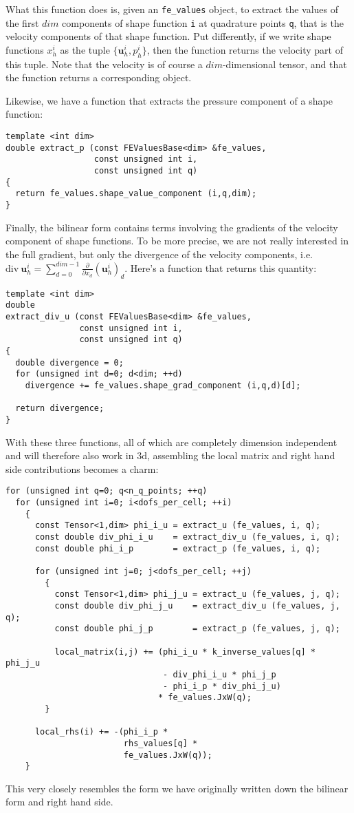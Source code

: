 \documentclass{article}
\renewcommand{\vec}[1]{\mathbf{#1}}
\begin{document}
What this function does is, given an \texttt{fe\_values} object, to extract
the values of the first $dim$ components of shape function \texttt{i} at
quadrature points \texttt{q}, that is the velocity components of that shape
function. Put differently, if we write shape functions $x_h^i$ as the tuple
$\{\vec u_h^i,p_h^i\}$, then the function returns the velocity part of this
tuple. Note that the velocity is of course a $dim$-dimensional tensor, and
that the function returns a corresponding object.

Likewise, we have a function that extracts the pressure component of a shape
function:
\begin{verbatim}
template <int dim>
double extract_p (const FEValuesBase<dim> &fe_values,
                  const unsigned int i,
                  const unsigned int q)
{
  return fe_values.shape_value_component (i,q,dim);
}
\end{verbatim}
Finally, the bilinear form contains terms involving the gradients of the
velocity component of shape functions. To be more precise, we are not really
interested in the full gradient, but only the divergence of the velocity
components, i.e. $\text{div}\ \vec u_h^i = \sum_{d=0}^{dim-1}
\frac{\partial}{\partial x_d} (\vec u_h^i)_d$. Here's a function that returns
this quantity:
\begin{verbatim}
template <int dim>
double
extract_div_u (const FEValuesBase<dim> &fe_values,
               const unsigned int i,
               const unsigned int q)
{
  double divergence = 0;
  for (unsigned int d=0; d<dim; ++d)
    divergence += fe_values.shape_grad_component (i,q,d)[d];

  return divergence;
}
\end{verbatim}

With these three functions, all of which are completely dimension independent
and will therefore also work in 3d, assembling the local matrix and right hand
side contributions becomes a charm:
\begin{verbatim}
for (unsigned int q=0; q<n_q_points; ++q) 
  for (unsigned int i=0; i<dofs_per_cell; ++i)
    {
      const Tensor<1,dim> phi_i_u = extract_u (fe_values, i, q);
      const double div_phi_i_u    = extract_div_u (fe_values, i, q);
      const double phi_i_p        = extract_p (fe_values, i, q);
           
      for (unsigned int j=0; j<dofs_per_cell; ++j)
        {
          const Tensor<1,dim> phi_j_u = extract_u (fe_values, j, q);
          const double div_phi_j_u    = extract_div_u (fe_values, j, q);
          const double phi_j_p        = extract_p (fe_values, j, q);
               
          local_matrix(i,j) += (phi_i_u * k_inverse_values[q] * phi_j_u
                                - div_phi_i_u * phi_j_p
                                - phi_i_p * div_phi_j_u)
                               * fe_values.JxW(q);
        }

      local_rhs(i) += -(phi_i_p *
                        rhs_values[q] *
                        fe_values.JxW(q));
    }
\end{verbatim}
This very closely resembles the form we have originally written down the
bilinear form and right hand side.
\end{document}
